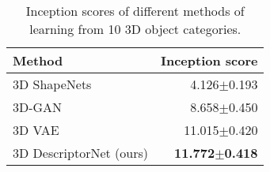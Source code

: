 \documentclass[10pt,twocolumn,letterpaper]{article}
\begin{document}
\begin{table}
\centering
\begin{small}
\caption{Inception scores of different methods of learning from 10 3D object categories.}\label{tb:inception}
\vspace{-2mm}
\begin{tabular}{|l|r|}
\hline 
Method &  Inception score \\ \hline \hline
3D ShapeNets \cite{wu20153d} & 4.126$\pm$0.193    \\ \hline
3D-GAN \cite{3dgan}& 8.658$\pm$0.450     \\ \hline
3D VAE \cite{kingma2013auto} & 11.015$\pm$0.420\\ \hline
3D DescriptorNet (ours) &  \textbf{11.772$\pm$0.418} \\ \hline
\end{tabular}
\end{small}
\end{table}
\vspace{-2mm}
\end{document}
